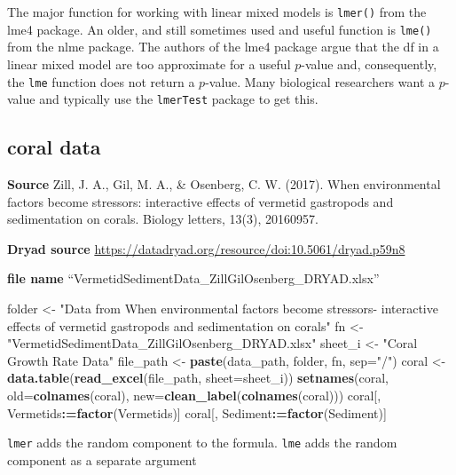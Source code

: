\documentclass[]{book}
\newenvironment{Shaded}{\begin{snugshade}}{\end{snugshade}}
\newcommand{\KeywordTok}[1]{\textcolor[rgb]{0.13,0.29,0.53}{\textbf{#1}}}
\newcommand{\DataTypeTok}[1]{\textcolor[rgb]{0.13,0.29,0.53}{#1}}
\newcommand{\StringTok}[1]{\textcolor[rgb]{0.31,0.60,0.02}{#1}}
\newcommand{\OperatorTok}[1]{\textcolor[rgb]{0.81,0.36,0.00}{\textbf{#1}}}
\newcommand{\ErrorTok}[1]{\textcolor[rgb]{0.64,0.00,0.00}{\textbf{#1}}}
\newcommand{\NormalTok}[1]{#1}
\begin{document}
The major function for working with linear mixed models is
\texttt{lmer()} from the lme4 package. An older, and still sometimes
used and useful function is \texttt{lme()} from the nlme package. The
authors of the lme4 package argue that the df in a linear mixed model
are too approximate for a useful \(p\)-value and, consequently, the
\texttt{lme} function does not return a \(p\)-value. Many biological
researchers want a \(p\)-value and typically use the \texttt{lmerTest}
package to get this.

\subsection{coral data}\label{coral-data}

\textbf{Source} Zill, J. A., Gil, M. A., \& Osenberg, C. W. (2017). When
environmental factors become stressors: interactive effects of vermetid
gastropods and sedimentation on corals. Biology letters, 13(3),
20160957.

\textbf{Dryad source}
\url{https://datadryad.org/resource/doi:10.5061/dryad.p59n8}

\textbf{file name} ``VermetidSedimentData\_ZillGilOsenberg\_DRYAD.xlsx''

\begin{Shaded}
\begin{Highlighting}[]
\NormalTok{folder <-}\StringTok{ "Data from When environmental factors become stressors- interactive effects of vermetid gastropods and sedimentation on corals"}
\NormalTok{fn <-}\StringTok{ "VermetidSedimentData_ZillGilOsenberg_DRYAD.xlsx"}
\NormalTok{sheet_i <-}\StringTok{ "Coral Growth Rate Data"}
\NormalTok{file_path <-}\StringTok{ }\KeywordTok{paste}\NormalTok{(data_path, folder, fn, }\DataTypeTok{sep=}\StringTok{"/"}\NormalTok{)}
\NormalTok{coral <-}\StringTok{ }\KeywordTok{data.table}\NormalTok{(}\KeywordTok{read_excel}\NormalTok{(file_path, }\DataTypeTok{sheet=}\NormalTok{sheet_i))}
\KeywordTok{setnames}\NormalTok{(coral, }\DataTypeTok{old=}\KeywordTok{colnames}\NormalTok{(coral), }\DataTypeTok{new=}\KeywordTok{clean_label}\NormalTok{(}\KeywordTok{colnames}\NormalTok{(coral)))}
\NormalTok{coral[, Vermetids}\OperatorTok{:}\ErrorTok{=}\KeywordTok{factor}\NormalTok{(Vermetids)]}
\NormalTok{coral[, Sediment}\OperatorTok{:}\ErrorTok{=}\KeywordTok{factor}\NormalTok{(Sediment)]}
\end{Highlighting}
\end{Shaded}

\texttt{lmer} adds the random component to the formula. \texttt{lme}
adds the random component as a separate argument
\end{document}
